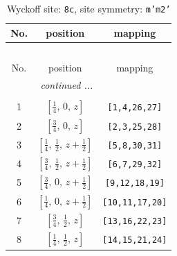 \documentclass[fleqn,8pt]{jsarticle}
\begin{document}
\begin{longtable}{ccc}
\caption{Wyckoff site: {\tt 8c}, site symmetry: {\tt m'm2'}}
 \\
 \hline \hline
No. & position & mapping \\ \hline \endfirsthead

\multicolumn{2}{l}{\tablename\ \thetable{}} \\
 \hline \hline
No. & position & mapping \\ \hline \endhead

 \hline \hline
\multicolumn{2}{r}{\footnotesize\it continued ...} \\ \endfoot

 \hline \hline
\multicolumn{2}{r}{} \\ \endlastfoot

1 & $\left[ \frac{1}{4},\, 0,\, z \right]$ & {\tt [1,4,26,27]} \\ \hline
2 & $\left[ \frac{3}{4},\, 0,\, z \right]$ & {\tt [2,3,25,28]} \\ \hline
3 & $\left[ \frac{1}{4},\, \frac{1}{2},\, z + \frac{1}{2} \right]$ & {\tt [5,8,30,31]} \\ \hline
4 & $\left[ \frac{3}{4},\, \frac{1}{2},\, z + \frac{1}{2} \right]$ & {\tt [6,7,29,32]} \\ \hline
5 & $\left[ \frac{3}{4},\, 0,\, z + \frac{1}{2} \right]$ & {\tt [9,12,18,19]} \\ \hline
6 & $\left[ \frac{1}{4},\, 0,\, z + \frac{1}{2} \right]$ & {\tt [10,11,17,20]} \\ \hline
7 & $\left[ \frac{3}{4},\, \frac{1}{2},\, z \right]$ & {\tt [13,16,22,23]} \\ \hline
8 & $\left[ \frac{1}{4},\, \frac{1}{2},\, z \right]$ & {\tt [14,15,21,24]} \\
\end{longtable}
\renewcommand{\arraystretch}{1.2}
\end{document}
